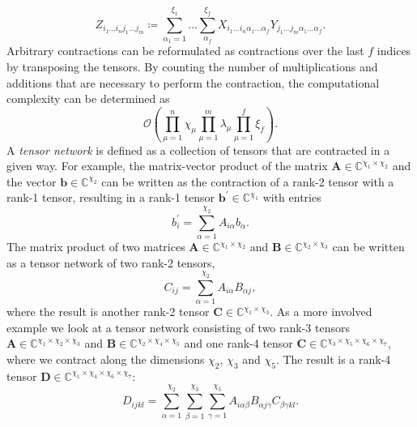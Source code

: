 \begin{equation}
	Z_{i_1\dots i_nj_1\dots j_m} \coloneqq \sum_{\alpha_1 = 1}^{\xi_1} \dots \sum_{\alpha_f}^{\xi_f} X_{i_1\dots i_n\alpha_1\dots\alpha_f} Y_{j_1\dots j_m\alpha_1\dots\alpha_f}.
\end{equation}
Arbitrary contractions can be reformulated as contractions over the last $f$ indices by transposing the tensors. By counting the number of multiplications and additions that are necessary to perform the contraction, the computational complexity can be determined as
\begin{equation}
	\label{eq:tensor_contraction_general_computational_complexity}
	\mathcal{O}\left(\prod_{\mu=1}^{n}\chi_\mu \prod_{\mu=1}^{m}\lambda_\mu \prod_{\mu=1}^{f}\xi_f\right).
\end{equation}
A \textit{tensor network} is defined as a collection of tensors that are contracted in a given way. For example, the matrix-vector product of the matrix $\bm{A} \in \mathbb{C}^{\chi_1\times\chi_2}$ and the vector $\bm{b} \in \mathbb{C}^{\chi_2}$ can be written as the contraction of a rank-2 tensor with a rank-1 tensor, resulting in a rank-1 tensor $\bm{b}^\prime \in \mathbb{C}^{\chi_1}$ with entries
\begin{equation}
	\label{eq:example_tensor_network_matrix_vector_product}
	b_i^\prime = \sum_{\alpha=1}^{\chi_2} A_{i\alpha} b_\alpha.
\end{equation}
The matrix product of two matrices $\bm{A} \in \mathbb{C}^{\chi_1\times\chi_2}$ and $\bm{B} \in \mathbb{C}^{\chi_2\times\chi_3}$ can be written as a tensor network of two rank-2 tensors,
\begin{equation}
	\label{eq:example_tensor_network_matrix_product}
	C_{ij} = \sum_{\alpha=1}^{\chi_2} A_{i\alpha} B_{\alpha j},
\end{equation}
where the result is another rank-2 tensor $\bm{C}\in\mathbb{C}^{\chi_1\times\chi_3}$.
As a more involved example we look at a tensor network consisting of two rank-3 tensors $\bm{A}\in\mathbb{C}^{\chi_1\times\chi_2\times\chi_3}$ and $\bm{B}\in\mathbb{C}^{\chi_2\times\chi_4\times\chi_5}$ and one rank-4 tensor $\bm{C}\in\mathbb{C}^{\chi_3\times\chi_5\times\chi_6\times\chi_7}$, where we contract along the dimensions $\chi_2$, $\chi_3$ and $\chi_5$. The result is a rank-4 tensor $\bm{D}\in\mathbb{C}^{\chi_1\times\chi_4\times\chi_6\times\chi_7}$:
\begin{equation}
	\label{eq:example_tensor_network_involved_network}
	D_{ijkl} = \sum_{\alpha=1}^{\chi_2} \sum_{\beta=1}^{\chi_3} \sum_{\gamma=1}^{\chi_5} A_{i \alpha \beta} B_{\alpha j\gamma} C_{\beta \gamma k l}.
\end{equation}
